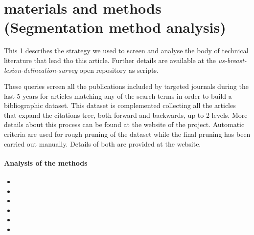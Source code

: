 \graphicspath{ {./content/analysis/figures/} }

\section{materials and methods (Segmentation method analysis)}
\label{sec:material-and-methods}
This \cref{sec:material-and-methods} describes the strategy we used to screen and analyse the body of technical literature that lead tho this article.
Further details are available at the \emph{us-breast-lesion-delineation-survey} open repository as scripts.

These queries screen all the publications included by targeted journals during the last 5 years for articles matching any of the search terms in order to build a bibliographic dataset. This dataset is complemented collecting all the articles that expand the citations tree, both forward and backwards, up to 2 levels. More details about this process can be found at the website of the project. Automatic criteria are used for rough pruning of the dataset while the final pruning has been carried out manually. Details of both are provided at the website.

\paragraph{Analysis of the methods}
\label{sec:intro:analysis_of_the_methods}
\begin{itemize}
  \item {}
  \item {}
  \item {}
  \item {}
  \item {}
  \item {}
\end{itemize}


